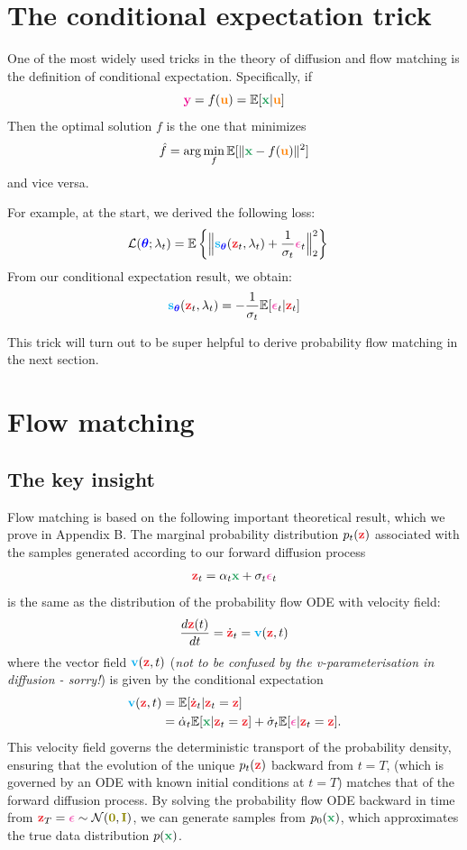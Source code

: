 \documentclass[usenames,dvipsnames]{article}
\DeclarePairedDelimiter{\norm}{\lVert}{\rVert}
\newcommand{\myvec}[1]{\mathbf{#1}}
\newcommand{\myvecsym}[1]{\boldsymbol{#1}}
\newcommand{\vx}{\myvec{\textcolor{ForestGreen}{x}}}
\newcommand{\vz}{\myvec{\textcolor{Red}{z}}}
\newcommand{\vy}{\myvec{\textcolor{Magenta}{y}}}
\newcommand{\vs}{\myvec{\textcolor{Cyan}{s}}}
\newcommand{\vu}{\myvec{\textcolor{orange}{u}}}
\newcommand{\vv}{\myvec{\textcolor{Cyan}{v}}}
\newcommand{\vzero}{\myvec{\textcolor{olive}{0}}}
\newcommand{\vI}{\myvec{\textcolor{olive}{I}}}
\newcommand{\vtheta}{\myvecsym{\textcolor{blue}{\theta}}}
\newcommand{\vepsilon}{\myvecsym{\textcolor{CarnationPink}{\epsilon}}}
\newcommand{\loss}{{\cal L}}
\newcommand{\E}{\mathbb{E}} %
\newcommand{\be}{\begin{equation}}
\newcommand{\ee}{\end{equation}}
\begin{document}
\section{The conditional expectation trick}


One of the most widely used tricks in the theory of diffusion and flow matching is the definition of conditional expectation. Specifically, if
\be
\vy = f(\vu)  = \E [\vx | \vu ]
\ee
Then the optimal solution $f$ is the one that minimizes
\be
\hat{f} = \arg \min_f \E [\norm{\vx - f( \vu )}^2]
\ee
and vice versa.

For example, at the start, we derived the following loss:
\begin{align}
  \loss(\vtheta;\lambda_t)
&=
 \E
 \left\{  
 \norm[\Big]{\vs_{\vtheta}(\vz_t,\lambda_t)
   + \frac{1}{\sigma_t}\vepsilon_t }_2^2 \right\}
\nonumber
\end{align}
From our conditional expectation result, we obtain:
\be
\vs_{\vtheta}(\vz_t,\lambda_t) = - \frac{1}{\sigma_t} \E[ \vepsilon_t | \vz_t ]
\ee

This trick will turn out to be super helpful to derive probability flow matching in the next section.


\section{Flow matching}

\subsection{The key insight}
Flow matching is based on the following important theoretical result, which we prove in Appendix B. The marginal probability distribution $p_t(\vz)$ associated with the samples generated according to our forward diffusion process
\begin{align}
\vz_t = \alpha_t \vx + \sigma_t \vepsilon_t \nonumber
\end{align}
is the same as the distribution of the probability flow ODE with velocity field:
\begin{align}
 \frac{d\vz(t)}{dt} = \dot{\vz}_t =  \vv(\vz, t)
\end{align}
where the vector field $\vv(\vz, t) $ (\emph{not to be confused by the v-parameterisation in diffusion - sorry!}) is given by the conditional expectation
\begin{align}
\vv(\vz, t) &= \mathbb{E}[\dot{\vz}_t | \vz_t = \vz] \nonumber \\
&= \dot{\alpha}_t \mathbb{E}[\vx | \vz_t = \vz] + \dot{\sigma}_t \mathbb{E}[\vepsilon | \vz_t = \vz].
\end{align}
This velocity field governs the deterministic transport of the probability density, ensuring that the evolution of the unique \( p_t(\vz) \) backward from $t=T$, (which is governed by an ODE with known initial conditions at $t=T$) matches that of the forward diffusion process. By solving the probability flow ODE backward in time from \( \vz_T = \vepsilon \sim \mathcal{N}(\vzero, \vI) \), we can generate samples from \( p_0(\vx) \), which approximates the true data distribution \( p(\vx) \).
\end{document}
